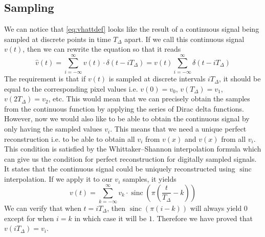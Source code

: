 \documentclass[a4paper,12pt,twoside,openright]{report}
\begin{document}
\subsection{Sampling}
We can notice that \ref{eq:vhattdef} looks like the result of a continuous signal being sampled at discrete points in time $T_{\Delta}$ apart. If we call this continuous signal $v(t)$, then we can rewrite the equation so that it reads
\begin{equation}
\hat{v}(t) = \sum\limits_{i=-\infty}^{\infty} v(t) \cdot \delta(t-i T_{\Delta}) = v(t) \sum\limits_{i=-\infty}^{\infty} \delta(t-i T_{\Delta})
\end{equation}
The requirement is that if $v(t)$ is sampled at discrete intervals $i T_{\Delta}$, it should be equal to the corresponding pixel values i.e. $v(0)=v_{0}$, $v(T_{\Delta})=v_{1}$, $v(2 T_{\Delta})=v_{2}$, etc. This would mean that we can precisely obtain the samples from the continuous function by applying the series of Dirac delta functions. However, now we would also like to be able to obtain the continuous signal by only having the sampled values $v_{i}$. This means that we need a unique perfect reconstruction i.e. to be able to obtain all $v_{i}$ from $v(x)$ and $v(x)$ from all $v_{i}$. This condition is satisfied by the Whittaker--Shannon interpolation formula\cite{shannon1949communication} which can give us the condition for perfect reconstruction for digitally sampled signals. It states that the continuous signal could be uniquely reconstructed using $\operatorname{sinc}$ interpolation. If we apply it to our $v_{i}$ samples, it yields
\begin{equation}
v(t) = \sum\limits_{k=-\infty}^{\infty} v_{k} \cdot \operatorname{sinc} ( \pi \left( \frac{t}{T_{\Delta}} - k \right) )
\end{equation}
We can verify that when $t=i T_{\Delta}$, then $\operatorname{sinc}(\pi (i-k) )$ will always yield $0$ except for when $i = k$ in which case it will be $1$. Therefore we have proved that $v(i T_{\Delta}) = v_{i}$.
\end{document}
